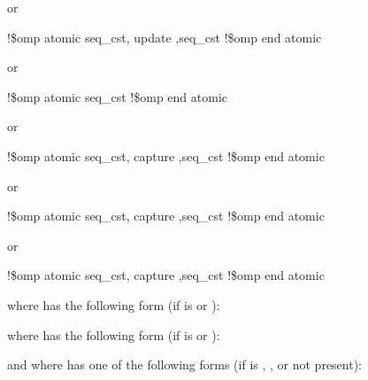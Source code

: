 {{{{or

\begin{boxedcode}
!\$omp atomic \plc{[}seq\_cst\plc{[},\plc{]]} update \plc{[[},\plc{]}seq\_cst\plc{]}
\plc{[}!\$omp end atomic\plc{]}
\end{boxedcode}

or

\begin{boxedcode}
!\$omp atomic \plc{[}seq\_cst\plc{]} 
\plc{[}!\$omp end atomic\plc{]}
\end{boxedcode}

or

\begin{boxedcode}
!\$omp atomic \plc{[}seq\_cst\plc{[},\plc{]]} capture \plc{[[},\plc{]}seq\_cst\plc{]}
!\$omp end atomic
\end{boxedcode}

or

\begin{boxedcode}
!\$omp atomic \plc{[}seq\_cst\plc{[},\plc{]]} capture \plc{[[},\plc{]}seq\_cst\plc{]}
!\$omp end atomic
\end{boxedcode}

or

\begin{boxedcode}
!\$omp atomic \plc{[}seq\_cst\plc{[},\plc{]]} capture \plc{[[},\plc{]}seq\_cst\plc{]}
!\$omp end atomic
\end{boxedcode}

where  has the following form (if  
is  or ):

\begin{quote}
\end{quote}

where  has the following form (if  
is  or ):

\begin{quote}
\end{quote}

\begin{figure}[t!]
\end{figure}
and where  has one of the following forms (if  is , 
, or not present):

}}}}
